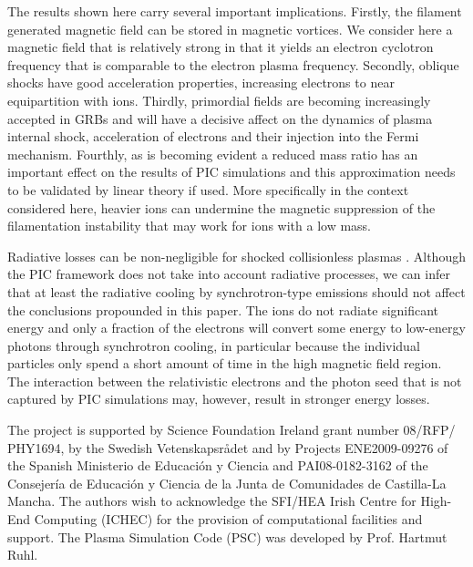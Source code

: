 \documentclass[structabstract]{aa}
\begin{document}
The results shown here carry several important implications. Firstly, the filament generated magnetic field 
can be stored in magnetic vortices. 
We consider here a magnetic field that
is relatively strong in that it yields an electron cyclotron frequency
that is comparable to the electron plasma frequency. 
Secondly, oblique shocks have good acceleration properties, increasing 
electrons to near equipartition with ions. Thirdly, primordial fields are becoming increasingly accepted in GRBs 
and will have a decisive affect on the dynamics of plasma internal shock, acceleration of electrons and their 
injection into the Fermi mechanism. Fourthly, as is becoming evident \citep{Lemoine:2010lr,Bret:2010fj} a reduced 
mass ratio has an important effect on the results of PIC simulations and this approximation needs to be validated 
by linear theory if used. More specifically in the context considered here, heavier ions can undermine the magnetic
suppression of the filamentation instability that may work for ions with a low mass.

Radiative losses can be non-negligible for shocked collisionless plasmas \citep{Fleishman:2007uq,Schlickeiser:2007kx,Schlickeiser:2008yq}. Although the PIC framework does not take into 
account radiative processes, we can infer that at least the radiative cooling by synchrotron-type emissions should 
not affect the conclusions propounded in this paper. The ions do not radiate significant energy and only a fraction 
of the electrons will convert some energy to low-energy photons through synchrotron cooling, in particular because 
the individual particles only spend a short amount of time in the high magnetic field region. The interaction
between the relativistic electrons and the photon seed that is not captured by PIC simulations may, however, result
in stronger energy losses.

\begin{acknowledgements}

The project is supported by Science Foundation Ireland grant number 08/RFP/ PHY1694, by the Swedish Vetenskapsr\aa det and by Projects
ENE2009-09276 of the Spanish Ministerio de Educaci\'{o}n y Ciencia and PAI08-0182-3162 of the Consejer\'{i}a 
de Educaci\'{o}n y Ciencia de la Junta de Comunidades de Castilla-La Mancha. The authors wish to acknowledge 
the SFI/HEA Irish Centre for High-End Computing (ICHEC) for the provision of computational facilities and support. 
The Plasma Simulation Code (PSC) was developed by Prof. Hartmut Ruhl.
\end{acknowledgements}



\end{document}
